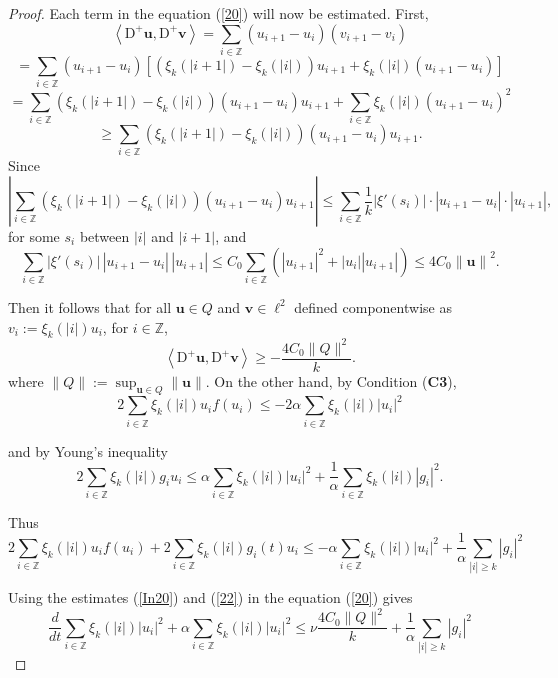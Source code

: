 \documentclass{amsart}%
\begin{document}
\begin{proof}
Each term in the equation (\ref{20}) will now be estimated. First,
\[
\left\langle \mathrm{D}^+ \mathbf{u}, \mathrm{D}^+ \mathbf{v} \right\rangle = \sum_{i \in \mathbb{Z}} (u_{i+1} - u_i)(v_{i+1} - v_i)
\]
\[
= \sum_{i \in \mathbb{Z}} (u_{i+1} - u_i) \left[ \left( \xi_k(|i+1|) - \xi_k(|i|) \right) u_{i+1} + \xi_k(|i|)(u_{i+1} - u_i) \right]
\]
\[
= \sum_{i \in \mathbb{Z}} \left( \xi_k(|i+1|) - \xi_k(|i|) \right) (u_{i+1} - u_i) u_{i+1} + \sum_{i \in \mathbb{Z}} \xi_k(|i|) (u_{i+1} - u_i)^2
\]
\[
\ge \sum_{i \in \mathbb{Z}} \left( \xi_k(|i+1|) - \xi_k(|i|) \right) (u_{i+1} - u_i) u_{i+1}.
\]
Since
\[
\left| \sum_{i \in \mathbb{Z}} \left( \xi_k(|i+1|) - \xi_k(|i|) \right) (u_{i+1} - u_i) u_{i+1} \right|
\le \sum_{i \in \mathbb{Z}} \frac{1}{k} |\xi'(s_i)| \cdot |u_{i+1} - u_i| \cdot |u_{i+1}|,
\]
for some \( s_i \) between \( |i| \) and \( |i+1| \), and
\[
\sum_{i \in \mathbb{Z}} |\xi'(s_i)| \, |u_{i+1} - u_i| \, |u_{i+1}|
\le C_0 \sum_{i \in \mathbb{Z}} \left( |u_{i+1}|^2 + |u_i||u_{i+1}| \right) \le 4 C_0 \left\| \mathbf{u} \right\|^2.
\]

Then it follows that for all \( \mathbf{u} \in Q \) and \( \mathbf{v} \in \ell^2 \) defined componentwise as \( v_i := \xi_k(|i|) u_i \), for \( i \in \mathbb{Z} \),
\begin{equation}\label{In20}
\left\langle \mathrm{D}^+ \mathbf{u}, \mathrm{D}^+ \mathbf{v} \right\rangle
\ge - \frac{4 C_0 \|Q\|^2}{k}.
\end{equation}
where \( \|Q\| := \sup_{\mathbf{u} \in Q} \left\| \mathbf{u}
\right\| \). On the other hand, by Condition (\textbf{C3}),
\[
2 \sum_{i \in \mathbb{Z}} \xi_k(|i|) u_i f(u_i) \le -2 \alpha \sum_{i \in \mathbb{Z}} \xi_k(|i|) |u_i|^2
\]

and by Young's inequality
\[
2 \sum_{i \in \mathbb{Z}} \xi_k(|i|) g_i u_i \le
\alpha \sum_{i \in \mathbb{Z}} \xi_k(|i|) |u_i|^2 +
\frac{1}{\alpha} \sum_{i \in \mathbb{Z}} \xi_k(|i|) |g_i|^2.
\]

Thus
\begin{equation}\label{22}
2 \sum_{i \in \mathbb{Z}} \xi_k(|i|) u_i f(u_i) + 2 \sum_{i \in
\mathbb{Z}} \xi_k(|i|) g_i(t) u_i \le -\alpha \sum_{i \in
\mathbb{Z}} \xi_k(|i|) |u_i|^2 + \frac{1}{\alpha} \sum_{|i| \ge k}
|g_i|^2
\end{equation}

Using the estimates (\ref{In20}) and (\ref{22}) in the equation (\ref{20}) gives
\begin{equation}\label{EqCDN1}
\frac{d}{dt} \sum_{i \in \mathbb{Z}} \xi_k(|i|) |u_i|^2 + \alpha
\sum_{i \in \mathbb{Z}} \xi_k(|i|) |u_i|^2 \le \nu \frac{4 C_0 \|
Q \|^2}{k} + \frac{1}{\alpha} \sum_{|i| \ge k} |g_i|^2
\end{equation}


\end{proof}
\end{document}
